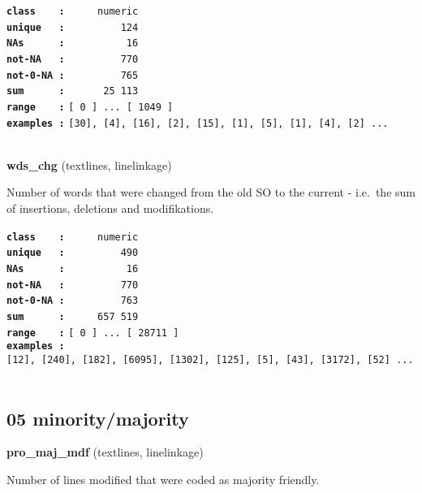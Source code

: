 \documentclass[]{article}
\begin{document}
\textbf{\texttt{class\ \ \ \ :}} \texttt{~~~~~numeric}\\
\textbf{\texttt{unique\ \ \ :}} \texttt{~~~~~~~~~124}\\
\textbf{\texttt{NAs\ \ \ \ \ \ :}} \texttt{~~~~~~~~~~16}\\
\textbf{\texttt{not-NA\ \ \ :}} \texttt{~~~~~~~~~770}\\
\textbf{\texttt{not-0-NA\ :}} \texttt{~~~~~~~~~765}\\
\textbf{\texttt{sum\ \ \ \ \ \ :}} \texttt{~~~~~~25~113}\\
\textbf{\texttt{range\ \ \ \ :}}
\texttt{{[}\ 0\ {]}\ ...\ {[}\ 1049\ {]}}\\
\textbf{\texttt{examples\ :}}
\texttt{{[}30{]},\ {[}4{]},\ {[}16{]},\ {[}2{]},\ {[}15{]},\ {[}1{]},\ {[}5{]},\ {[}1{]},\ {[}4{]},\ {[}2{]}\ ...}\\

~

\textbf{wds\_chg} (textlines, linelinkage)

Number of words that were changed from the old SO to the current -
i.e.~the sum of insertions, deletions and modifikations.

\textbf{\texttt{class\ \ \ \ :}} \texttt{~~~~~numeric}\\
\textbf{\texttt{unique\ \ \ :}} \texttt{~~~~~~~~~490}\\
\textbf{\texttt{NAs\ \ \ \ \ \ :}} \texttt{~~~~~~~~~~16}\\
\textbf{\texttt{not-NA\ \ \ :}} \texttt{~~~~~~~~~770}\\
\textbf{\texttt{not-0-NA\ :}} \texttt{~~~~~~~~~763}\\
\textbf{\texttt{sum\ \ \ \ \ \ :}} \texttt{~~~~~657~519}\\
\textbf{\texttt{range\ \ \ \ :}}
\texttt{{[}\ 0\ {]}\ ...\ {[}\ 28711\ {]}}\\
\textbf{\texttt{examples\ :}}
\texttt{{[}12{]},\ {[}240{]},\ {[}182{]},\ {[}6095{]},\ {[}1302{]},\ {[}125{]},\ {[}5{]},\ {[}43{]},\ {[}3172{]},\ {[}52{]}\ ...}\\

~

\subsection{05 minority/majority}\label{minoritymajority}

\textbf{pro\_maj\_mdf} (textlines, linelinkage)

Number of lines modified that were coded as majority friendly.
\end{document}
